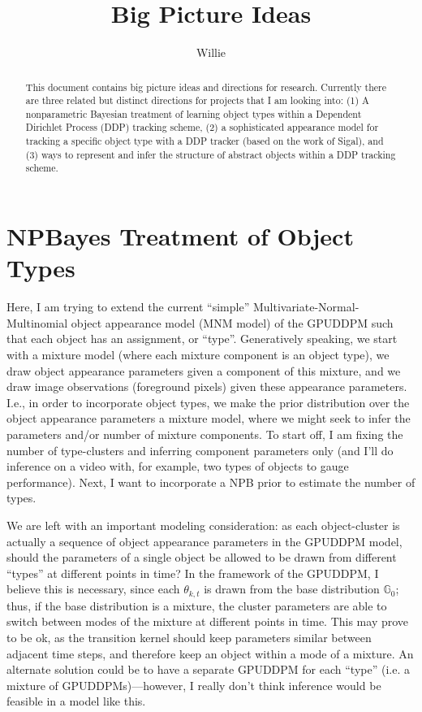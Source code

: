 \documentclass{article}
\begin{document}

\title{Big Picture Ideas}
\author{Willie}
\maketitle



\begin{abstract}
This document contains big picture ideas and directions for research. Currently there are three related but distinct directions for projects that I am looking into: (1) A nonparametric Bayesian treatment of learning object types within a Dependent Dirichlet Process (DDP) tracking scheme, (2) a sophisticated appearance model for tracking a specific object type with a DDP tracker (based on the work of Sigal), and (3) ways to represent and infer the structure of abstract objects within a DDP tracking scheme.
\end{abstract}


\section{NPBayes Treatment of Object Types}

Here, I am trying to extend the current ``simple'' Multivariate-Normal-Multinomial object appearance model (MNM model) of the GPUDDPM such that each object has an assignment, or ``type''. Generatively speaking, we start with a mixture model (where each mixture component is an object type), we draw object appearance parameters given a component of this mixture, and we draw image observations (foreground pixels) given these appearance parameters. I.e., in order to incorporate object types, we make the prior distribution over the object appearance parameters a mixture model, where we might seek to infer the parameters and/or number of mixture components. To start off, I am fixing the number of type-clusters and inferring component parameters only (and I'll do inference on a video with, for example, two types of objects to gauge performance). Next, I want to incorporate a NPB prior to estimate the number of types.

We are left with an important modeling consideration: as each object-cluster is actually a sequence of object appearance parameters in the GPUDDPM model, should the parameters of a single object be allowed to be drawn from different ``types'' at different points in time? In the framework of the GPUDDPM, I believe this is necessary, since each $\theta_{k,t}$ is drawn from the base distribution $\mathbb{G}_{0}$; thus, if the base distribution is a mixture, the cluster parameters are able to switch between modes of the mixture at different points in time. This may prove to be ok, as the transition kernel should keep parameters similar between adjacent time steps, and therefore keep an object within a mode of a mixture. An alternate solution could be to have a separate GPUDDPM for each ``type'' (i.e. a mixture of GPUDDPMs)---however, I really don't think inference would be feasible in a model like this.
\end{document}
